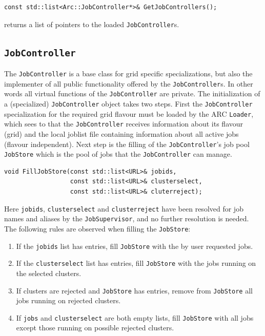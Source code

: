 \documentclass{book}
\newcommand{\JobController}{\texttt{JobController}}
\newcommand{\JobSupervisor}{\texttt{JobSupervisor}}
\newcommand{\Loader}{\texttt{Loader}}
\begin{document}
\begin{shaded}
\begin{verbatim}
const std::list<Arc::JobController*>& GetJobControllers();
\end{verbatim}
\end{shaded}

returns a list of pointers to the loaded {\JobController}s.

\subsection{{\JobController}}

The {\JobController} is a base class for grid specific
specializations, but also the implementer of all public functionality
offered by the {\JobController}s. In other words all virtual functions
of the {\JobController} are private. The initialization of a
(specialized) {\JobController} object takes two steps. First the
{\JobController} specialization for the required grid flavour must be
loaded by the ARC {\Loader}, which sees to that the {\JobController}
receives information about its flavour (grid) and the local joblist
file containing information about all active jobs (flavour
independent). Next step is the filling of the {\JobController}'s job
pool \texttt{JobStore} which is the pool of jobs that the
{\JobController} can manage.

\begin{shaded}
\begin{verbatim}
void FillJobStore(const std::list<URL>& jobids,
                  const std::list<URL>& clusterselect,
                  const std::list<URL>& cluterreject);
\end{verbatim}
\end{shaded}

Here \texttt{jobids}, \texttt{clusterselect} and
\texttt{clusterreject} have been resolved for job names and aliases by
the {\JobSupervisor}, and no further resolution is needed. The
following rules are observed when filling the \texttt{JobStore}:

\begin{enumerate}
\item{If the \texttt{jobids} list has entries, fill \texttt{JobStore}
  with the by user requested jobs.}
\item{If the \texttt{clusterselect} list has entries, fill
  \texttt{JobStore} with the jobs running on the selected clusters.}
\item{If clusters are rejected and \texttt{JobStore} has entries,
  remove from \texttt{JobStore} all jobs running on rejected
  clusters.}
\item{If \texttt{jobs} and \texttt{clusterselect} are both empty
  lists, fill \texttt{JobStore} with all jobs except those running on
  possible rejected clusters.}
\end{enumerate}
\end{document}
